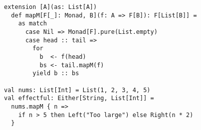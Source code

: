 \begin{algorithm}

\begin{verbatim}
extension [A](as: List[A])
  def mapM[F[_]: Monad, B](f: A => F[B]): F[List[B]] =
    as match
      case Nil => Monad[F].pure(List.empty)
      case head :: tail =>
        for
          b  <- f(head)
          bs <- tail.mapM(f)
        yield b :: bs
        
val nums: List[Int] = List(1, 2, 3, 4, 5)
val effectful: Either[String, List[Int]] =
  nums.mapM { n =>
    if n > 5 then Left("Too large") else Right(n * 2)
  }
\end{verbatim}

\caption{Monadic  function for  in Scala. %
\label{monad:mapm}}
\end{algorithm}